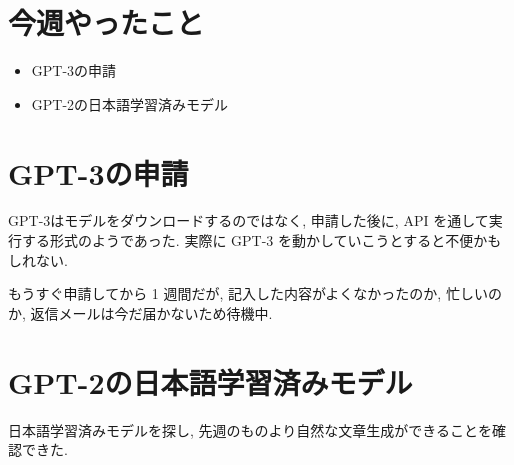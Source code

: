\documentclass[twocolumn]{jarticle}     %
\begin{document}



\section{今週やったこと}
\begin{itemize}
  \item GPT-3の申請
  \item GPT-2の日本語学習済みモデル
\end{itemize}

\section{GPT-3の申請}
GPT-3はモデルをダウンロードするのではなく,
申請した後に, API を通して実行する形式のようであった.
実際に GPT-3 を動かしていこうとすると不便かもしれない.

もうすぐ申請してから 1 週間だが, 記入した内容がよくなかったのか,
忙しいのか, 
返信メールは今だ届かないため待機中.

\section{GPT-2の日本語学習済みモデル}
日本語学習済みモデルを探し, 先週のものより自然な文章生成ができることを確認できた.
\end{document}
